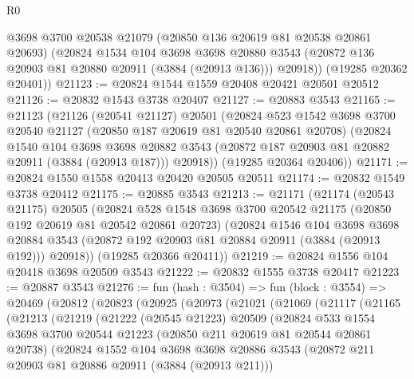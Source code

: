 \begin{lexlean}{R0}
\begin{coremodule}
        @3698
        @3700
        @20538
        @21079
        (@20850 @136 @20619 @81 @20538 @20861 @20693)
        (@20824
          @1534
          @104
          @3698
          @3698
          @20880
          @3543
          (@20872 @136 @20903 @81 @20880 @20911 (@3884 (@20913 @136)))
          @20918))
      (@19285 @20362 @20401))
@21123 := @20824 @1544 @1559 @20408 @20421 @20501 @20512
@21126 := @20832 @1543 @3738 @20407
@21127 := @20883 @3543
@21165 := @21123
    (@21126
      (@20541 @21127)
      @20501
      (@20824
        @523
        @1542
        @3698
        @3700
        @20540
        @21127
        (@20850 @187 @20619 @81 @20540 @20861 @20708)
        (@20824
          @1540
          @104
          @3698
          @3698
          @20882
          @3543
          (@20872 @187 @20903 @81 @20882 @20911 (@3884 (@20913 @187)))
          @20918))
      (@19285 @20364 @20406))
@21171 := @20824 @1550 @1558 @20413 @20420 @20505 @20511
@21174 := @20832 @1549 @3738 @20412
@21175 := @20885 @3543
@21213 := @21171
    (@21174
      (@20543 @21175)
      @20505
      (@20824
        @528
        @1548
        @3698
        @3700
        @20542
        @21175
        (@20850 @192 @20619 @81 @20542 @20861 @20723)
        (@20824
          @1546
          @104
          @3698
          @3698
          @20884
          @3543
          (@20872 @192 @20903 @81 @20884 @20911 (@3884 (@20913 @192)))
          @20918))
      (@19285 @20366 @20411))
@21219 := @20824 @1556 @104 @20418 @3698 @20509 @3543
@21222 := @20832 @1555 @3738 @20417
@21223 := @20887 @3543
@21276 := fun (hash : @3504) =>
  fun (block : @3554) =>
  @20469
    (@20812
      (@20823
        (@20925
          (@20973
            (@21021
              (@21069
                (@21117
                  (@21165
                    (@21213
                      (@21219
                        (@21222
                          (@20545 @21223)
                          @20509
                          (@20824
                            @533
                            @1554
                            @3698
                            @3700
                            @20544
                            @21223
                            (@20850 @211 @20619 @81 @20544 @20861 @20738)
                            (@20824
                              @1552
                              @104
                              @3698
                              @3698
                              @20886
                              @3543
                              (@20872 @211 @20903 @81 @20886 @20911 (@3884 (@20913 @211)))

\end{coremodule}
\end{lexlean}
